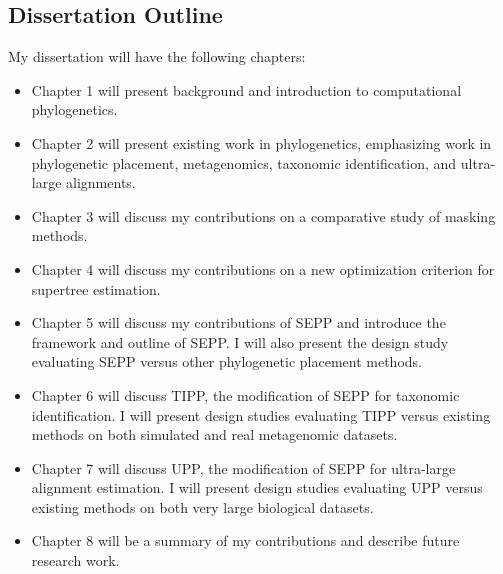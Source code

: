 \documentclass[times, 10pt]{article}
\begin{document}
\subsection{Dissertation Outline}
My dissertation will have the following chapters:
\begin{itemize}
\item Chapter 1 will present background and introduction to computational phylogenetics.
\item Chapter 2 will present existing work in phylogenetics, emphasizing work in phylogenetic placement, metagenomics, taxonomic identification, and ultra-large alignments.
\item Chapter 3 will discuss my contributions on a comparative study of masking methods.  
\item Chapter 4 will discuss my contributions on a new optimization criterion for supertree estimation.  
\item Chapter 5 will discuss my contributions of SEPP and introduce the framework and outline of SEPP.  I will also present the design study evaluating SEPP versus other phylogenetic placement methods.
\item Chapter 6 will discuss TIPP, the modification of SEPP for taxonomic identification.  I will present design studies evaluating TIPP versus existing methods on both simulated and real metagenomic datasets.
\item Chapter 7 will discuss UPP, the modification of SEPP for ultra-large alignment estimation.  I will present design studies evaluating UPP versus existing methods on both very large biological datasets.
\item Chapter 8 will be a summary of my contributions and describe future research work.
\end{itemize}



\end{document}
